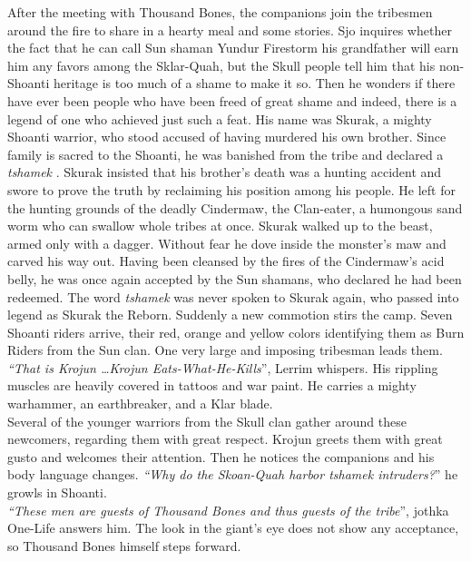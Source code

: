 After the meeting with Thousand Bones, the companions join the tribesmen around the fire to share in a hearty meal and some stories. Sjo inquires whether the fact that he can call Sun shaman Yundur Firestorm his grandfather will earn him any favors among the Sklar-Quah, but the Skull people tell him that his non-Shoanti heritage is too much of a shame to make it so. Then he wonders if there have ever been people who have been freed of great shame and indeed, there is a legend of one who achieved just such a feat. His name was Skurak, a mighty Shoanti warrior, who stood accused of having murdered his own brother. Since family is sacred to the Shoanti, he was banished from the tribe and declared a {\itshape tshamek} . Skurak insisted that his brother's death was a hunting accident and swore to prove the truth by reclaiming his position among his people. He left for the hunting grounds of the deadly Cindermaw, the Clan-eater, a humongous sand worm who can swallow whole tribes at once. Skurak walked up to the beast, armed only with a dagger. Without fear he dove inside the monster's maw and carved his way out. Having been cleansed by the fires of the Cindermaw's acid belly, he was once again accepted by the Sun shamans, who declared he had been redeemed. The word  {\itshape tshamek} was never spoken to Skurak again, who passed into legend as Skurak the Reborn. Suddenly a new commotion stirs the camp. Seven Shoanti riders arrive, their red, orange and yellow colors identifying them as Burn Riders from the Sun clan. One very large and imposing tribesman leads them. {\itshape``That is Krojun \ldots Krojun Eats-What-He-Kills}'', Lerrim whispers. His rippling muscles are heavily covered in tattoos and war paint. He carries a mighty warhammer, an earthbreaker, and a Klar blade.\\

Several of the younger warriors from the Skull clan gather around these newcomers, regarding them with great respect. Krojun greets them with great gusto and welcomes their attention. Then he notices the companions and his body language changes. {\itshape``Why do the Skoan-Quah harbor tshamek intruders?}'' he growls in Shoanti.\\

{\itshape``These men are guests of Thousand Bones and thus guests of the tribe}'', jothka One-Life answers him. The look in the giant's eye does not show any acceptance, so Thousand Bones himself steps forward.\\

